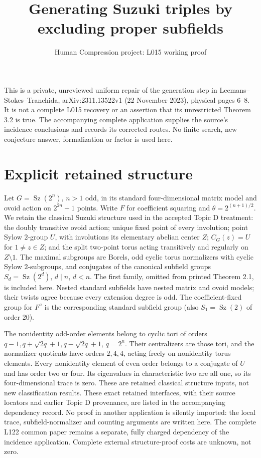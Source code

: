 \documentclass[11pt,a4paper]{article}
\title{Generating Suzuki triples by excluding proper subfields}
\author{Human Compression project: L015 working proof}\date{}
\newcommand{\Sz}{\operatorname{Sz}}\newcommand{\Aut}{\operatorname{Aut}}\newcommand{\gen}[1]{\langle#1\rangle}
\begin{document}
\maketitle
\noindent This is a private, unreviewed uniform repair of the generation step
in Leemans--Stokes--Tranchida, arXiv:2311.13522v1 (22 November 2023),
physical pages 6--8. It is not a complete L015 recovery or an assertion that
its unrestricted Theorem 3.2 is true. The accompanying complete application
supplies the source's incidence conclusions and records its corrected routes.
No finite search, new conjecture answer, formalization or factor is used here.

\section{Explicit retained structure}
Let $G=\Sz(2^n)$, $n>1$ odd, in its standard four-dimensional matrix
model and ovoid action on $2^{2n}+1$ points. Write $F$ for coefficient
squaring and $\theta=2^{(n+1)/2}$. We retain the classical Suzuki structure
used in the accepted Topic D treatment: the doubly transitive ovoid action;
unique fixed point of every involution; point Sylow $2$-group $U$, with
involutions its elementary abelian center $Z$; $C_G(z)=U$ for $1\ne z\in Z$;
and the split two-point torus acting transitively and regularly on $Z\setminus1$.
The maximal subgroups are Borels, odd cyclic torus normalizers with cyclic
Sylow $2$-subgroups, and conjugates of the canonical subfield groups
$S_d=\Sz(2^d)$, $d\mid n$, $d<n$. The first family, omitted from printed
Theorem 2.1, is included here. Nested standard subfields have nested
matrix and ovoid models; their twists agree because every extension degree
is odd. The coefficient-fixed group for $F^a$ is the corresponding
standard subfield group (also $S_1=\Sz(2)$ of order $20$).

The nonidentity odd-order elements belong to cyclic tori of orders
$q-1,q+\sqrt{2q}+1,q-\sqrt{2q}+1$, $q=2^n$. Their centralizers are those
tori, and the normalizer quotients have orders $2,4,4$, acting freely on
nonidentity torus elements. Every nonidentity element of even order belongs
to a conjugate of $U$ and has order two or four. Its eigenvalues in
characteristic two are all one, so its four-dimensional trace is zero.
These are retained classical structure inputs, not new
classification results. These exact retained interfaces, with their source
locators and earlier Topic D provenance, are listed in the accompanying
dependency record. No proof in another application is silently imported:
the local trace, subfield-normalizer and counting arguments are written here.
The complete L122 common paper remains a separate, fully charged dependency
of the incidence application. Complete external structure-proof costs are
unknown, not zero.
\end{document}
